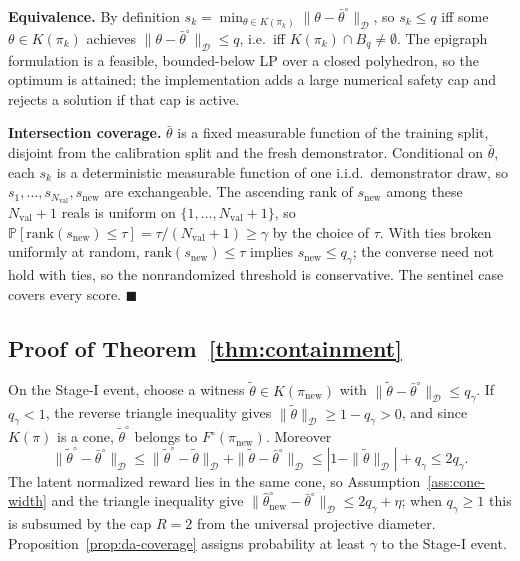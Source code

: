 \documentclass{article}
\newcommand{\Dnorm}[1]{\|#1\|_{\mathcal D}}
\begin{document}
\textbf{Equivalence.} By definition $s_k=\min_{\theta\in K(\pi_k)}
\Dnorm{\theta-\bar\theta^\circ}$, so $s_k\le q$ iff some $\theta\in K(\pi_k)$
achieves $\Dnorm{\theta-\bar\theta^\circ}\le q$, i.e.\ iff $K(\pi_k)\cap
B_q\ne\emptyset$. The epigraph formulation is a feasible, bounded-below LP over
a closed polyhedron, so the optimum is attained; the implementation adds a
large numerical safety cap and rejects a solution if that cap is active.

\textbf{Intersection coverage.} $\bar\theta$ is a fixed measurable function of the training
split, disjoint from the calibration split and the fresh demonstrator.
Conditional on $\bar\theta$, each $s_k$ is a deterministic measurable function
of one i.i.d.\ demonstrator draw, so
$s_1,\dots,s_{N_{\mathrm{val}}},s_{\mathrm{new}}$ are exchangeable. The
ascending rank of $s_{\mathrm{new}}$ among these $N_{\mathrm{val}}+1$ reals is
uniform on $\{1,\dots,N_{\mathrm{val}}+1\}$, so
$\mathbb P[\mathrm{rank}(s_{\mathrm{new}})\le\tau]=\tau/(N_{\mathrm{val}}+1)\ge
\gamma$ by the choice of $\tau$. With ties broken uniformly at random,
$\mathrm{rank}(s_{\mathrm{new}})\le\tau$ implies
$s_{\mathrm{new}}\le q_\gamma$; the converse need not hold with ties, so the
nonrandomized threshold is conservative. The sentinel case covers every score.
$\blacksquare$

\subsection{Proof of Theorem~\ref{thm:containment}}
\label{app:proof-containment}

On the Stage-I event, choose a witness $\tilde\theta\in K(\pi_{\mathrm{new}})$
with $\Dnorm{\tilde\theta-\bar\theta^\circ}\le q_\gamma$. If $q_\gamma<1$, the
reverse triangle inequality gives $\Dnorm{\tilde\theta}\ge1-q_\gamma>0$, and
since $K(\pi)$ is a cone, $\tilde\theta^\circ$ belongs to
$F^\circ(\pi_{\mathrm{new}})$. Moreover
\[
\Dnorm{\tilde\theta^\circ-\bar\theta^\circ}
\le \Dnorm{\tilde\theta^\circ-\tilde\theta}+\Dnorm{\tilde\theta-\bar\theta^\circ}
\le|1-\Dnorm{\tilde\theta}|+q_\gamma\le2q_\gamma.
\]
The latent normalized reward lies in the same cone, so
Assumption~\ref{ass:cone-width} and the triangle inequality give
$\Dnorm{\hat\theta_{\mathrm{new}}^\circ-\bar\theta^\circ}\le2q_\gamma+\eta$;
when $q_\gamma\ge1$ this is subsumed by the cap $R=2$ from the universal
projective diameter. Proposition~\ref{prop:da-coverage} assigns probability at
least $\gamma$ to the Stage-I event.
\end{document}
